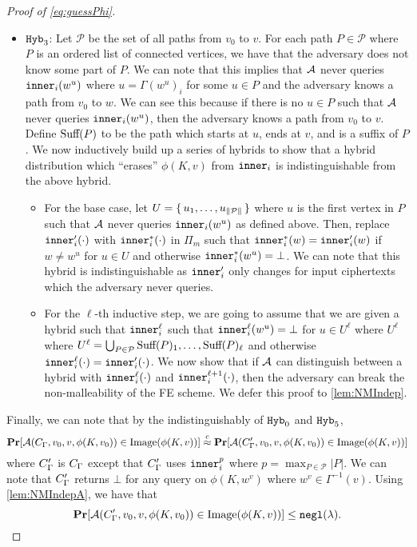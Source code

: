 \begin{proof}[Proof of \cref{eq:guessPhi}]
\begin{itemize}
		\item $\texttt{Hyb}_3$: Let $\mathcal{P}$ be the set of all paths from $v_0$ to $v$. For each path $P \in \mathcal{P}$
		where $P$ is an ordered list of connected vertices, we have that the adversary does not know
		some part of $P$. We can note that this implies that $\mathcal{A}$ never queries
		$\texttt{inner}_i(w^u)$ where $u = \Gamma(w^u)_i$ for some $u \in P$ and the adversary knows a path from $v_0$ to $w$.
		We can see this because if there is no $u \in P$ such that $\mathcal{A}$ never queries $\texttt{inner}_i(w^u)$,
		then the adversary knows a path from $v_0$ to $v$. Define $\text{Suff}(P)$ to be the path 
		which starts at $u$, ends at $v$, and is a suffix of $P$.
		We now inductively build up a series of hybrids to show that a hybrid distribution
		which ``erases'' $\phi(K, v)$ from $\texttt{inner}_i$ is indistinguishable from the above hybrid.
		\begin{itemize}
			\item For the base case, let $U = \set{u_1, \dots, u_{\|\mathcal{P}\|} }$
			where $u$ is the first vertex in $P$ such that $\mathcal{A}$ never queries $\texttt{inner}_i(w^u)$ as defined above.
			Then, replace $\texttt{inner}_i'(\cdot)$ with $\texttt{inner}_i^*(\cdot)$ in $\Pi_m$ such that $\texttt{inner}_i^*(w) = \texttt{inner}_i'(w)$
			if $w \neq w^u$ for $u \in U$ and otherwise $\texttt{inner}_i^*(w^u) = \bot$. We can note that this hybrid is indistinguishable as
			$\texttt{inner}_i'$ only changes for input ciphertexts which the adversary never queries.
			\item For the $\ell$-th inductive step, we are going to assume that we are given a hybrid such that $\texttt{inner}_i^\ell$ such that $\texttt{inner}_i^\ell(w^u) = \bot$
			for $u \in U^\ell$ where $U^\ell$ where $U^\ell = \bigcup_{P \in \mathcal{P}} \text{Suff}(P)_1, \dots, \text{Suff}(P)_\ell$
			and otherwise $\texttt{inner}_i^\ell(\cdot) = \texttt{inner}_i'(\cdot)$. We now show that if $\mathcal{A}$ can distinguish
			between a hybrid with $\texttt{inner}_i^\ell(\cdot)$ and $\texttt{inner}_i^{\ell + 1}(\cdot)$, then the adversary can break
			the non-malleability of the FE scheme.
			We defer this proof to \cref{lem:NMIndep}.
		\end{itemize}
	\end{itemize}
	Finally, we can note that by the indistinguishably of $\texttt{Hyb}_0$ and $\texttt{Hyb}_5$,
	\begin{equation*}
		\operatorname*{\mathbf{Pr}}[\mathcal{A}(C_\Gamma, v_0, v, \phi(K, v_0)) \in \text{Image}(\phi(K, v))] 
		\overset{c}{\approx}
		\operatorname*{\mathbf{Pr}}[\mathcal{A}(C_\Gamma', v_0, v, \phi(K, v_0)) \in \text{Image}(\phi(K, v))] 
	\end{equation*}
	where $C_\Gamma'$ is $C_\Gamma$ except that $C_\Gamma'$ uses $\texttt{inner}_i^p$ where $p = \max_{P \in \mathcal{P}} |P|$.
	We can note that $C_\Gamma'$ returns $\bot$ for any query on $\phi(K, w^v)$ where $w^v \in \Gamma^{-1}(v)$.
	Using \cref{lem:NMIndepA}, we have that
	$$
		\operatorname*{\mathbf{Pr}}[\mathcal{A}(C_\Gamma', v_0, v, \phi(K, v_0)) \in \text{Image}(\phi(K, v))] \leq \texttt{negl}(\lambda).
	$$
	
\end{proof}

